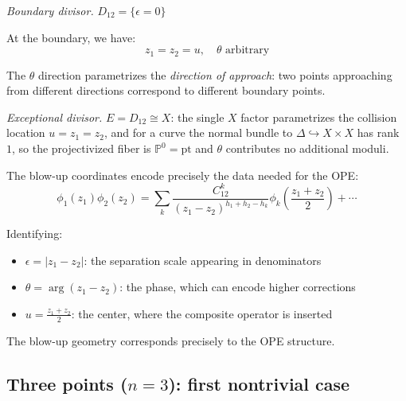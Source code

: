 \begin{example}
\emph{Boundary divisor.} $D_{12} = \{\epsilon = 0\}$

At the boundary, we have:
\[z_1 = z_2 = u, \quad \theta \text{ arbitrary}\]

The $\theta$ direction parametrizes the \emph{direction of approach}: two points
approaching from different directions correspond to different boundary points.

\emph{Exceptional divisor.} $E = D_{12} \cong X$: the single $X$ factor parametrizes the collision location $u = z_1 = z_2$, and for a curve the normal bundle to $\Delta \hookrightarrow X \times X$ has rank~$1$, so the projectivized fiber is $\mathbb{P}^0 = \mathrm{pt}$ and $\theta$ contributes no additional moduli.
\end{example}

\begin{remark}
The blow-up coordinates encode precisely the data needed for the OPE:
\[\phi_1(z_1)\phi_2(z_2) = \sum_k \frac{C_{12}^k}{(z_1-z_2)^{h_1+h_2-h_k}} \phi_k\left(
\frac{z_1+z_2}{2}\right) + \cdots\]

Identifying:
\begin{itemize}
\item $\epsilon = |z_1 - z_2|$: the separation scale appearing in denominators
\item $\theta = \arg(z_1 - z_2)$: the phase, which can encode higher corrections
\item $u = \frac{z_1 + z_2}{2}$: the center, where the composite operator is inserted
\end{itemize}

The blow-up geometry corresponds precisely to the OPE structure.
\end{remark}

\subsection{\texorpdfstring{Three points ($n=3$): first nontrivial case}{Three points (n=3): first nontrivial case}}

